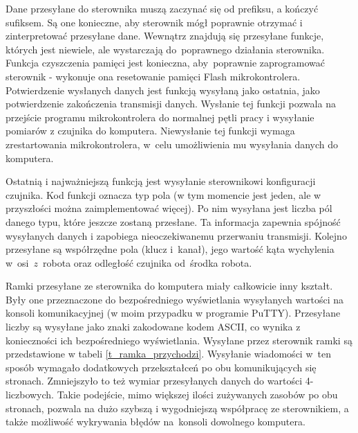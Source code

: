Dane przesyłane do sterownika muszą zaczynać się od prefiksu, a kończyć sufiksem. Są one konieczne, aby sterownik mógł poprawnie otrzymać i zinterpretować przesyłane dane. Wewnątrz znajdują się przesyłane funkcje, których jest niewiele, ale wystarczają do~poprawnego działania sterownika. Funkcja czyszczenia pamięci jest konieczna, aby~poprawnie zaprogramować sterownik - wykonuje ona resetowanie pamięci Flash mikrokontrolera. Potwierdzenie wysłanych danych jest funkcją wysyłaną jako ostatnia, jako potwierdzenie zakończenia transmisji danych. Wysłanie tej funkcji pozwala na przejście programu mikrokontrolera do normalnej pętli pracy i wysyłanie pomiarów z czujnika do komputera. Niewysłanie tej funkcji wymaga zrestartowania mikrokontrolera, w~celu umożliwienia mu wysyłania danych do komputera.

Ostatnią i najważniejszą funkcją jest wysyłanie sterownikowi konfiguracji czujnika. Kod funkcji oznacza typ pola (w tym momencie jest jeden, ale w przyszłości można zaimplementować więcej). Po nim wysyłana jest liczba pól danego typu, które jeszcze zostaną przesłane. Ta informacja zapewnia spójność wysyłanych danych i zapobiega nieoczekiwanemu przerwaniu transmisji. Kolejno przesyłane są współrzędne pola (klucz i~kanał), jego wartość kąta wychylenia w~osi~$z$~robota oraz odległość czujnika od~środka robota.

Ramki przesyłane ze sterownika do komputera miały całkowicie inny kształt. Były one przeznaczone do bezpośredniego wyświetlania wysyłanych wartości na konsoli komunikacyjnej (w moim przypadku w programie PuTTY). Przesyłane liczby są wysyłane jako znaki zakodowane kodem ASCII, co wynika z konieczności ich bezpośredniego wyświetlania. Wysyłane przez sterownik ramki są przedstawione w tabeli \ref{t_ramka_przychodzi}. Wysyłanie wiadomości w~ten sposób wymagało dodatkowych przekształceń po obu komunikujących się stronach. Zmniejszyło to też wymiar przesyłanych danych do wartości 4-liczbowych. Takie podejście, mimo większej ilości zużywanych zasobów po obu stronach, pozwala na dużo szybszą i wygodniejszą współpracę ze sterownikiem, a także możliwość wykrywania błędów na~konsoli dowolnego komputera.

